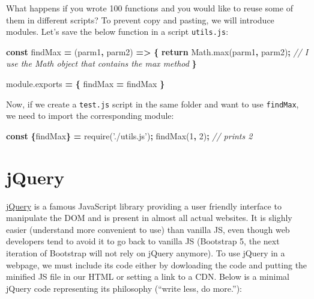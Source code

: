 \documentclass[]{book}
\newenvironment{Shaded}{\begin{snugshade}}{\end{snugshade}}
\newcommand{\AttributeTok}[1]{\textcolor[rgb]{0.77,0.63,0.00}{#1}}
\newcommand{\CommentTok}[1]{\textcolor[rgb]{0.56,0.35,0.01}{\textit{#1}}}
\newcommand{\ControlFlowTok}[1]{\textcolor[rgb]{0.13,0.29,0.53}{\textbf{#1}}}
\newcommand{\DecValTok}[1]{\textcolor[rgb]{0.00,0.00,0.81}{#1}}
\newcommand{\KeywordTok}[1]{\textcolor[rgb]{0.13,0.29,0.53}{\textbf{#1}}}
\newcommand{\NormalTok}[1]{#1}
\newcommand{\OperatorTok}[1]{\textcolor[rgb]{0.81,0.36,0.00}{\textbf{#1}}}
\newcommand{\StringTok}[1]{\textcolor[rgb]{0.31,0.60,0.02}{#1}}
\newcommand{\VariableTok}[1]{\textcolor[rgb]{0.00,0.00,0.00}{#1}}
\begin{document}
What happens if you wrote 100 functions and you would like to reuse some of them in different scripts? To prevent copy and pasting, we will introduce modules. Let's save the below function in a script \texttt{utils.js}:

\begin{Shaded}
\begin{Highlighting}[]
\KeywordTok{const}\NormalTok{ findMax }\OperatorTok{=}\NormalTok{ (parm1}\OperatorTok{,}\NormalTok{ parm2) }\OperatorTok{=>} \OperatorTok{\{}
  \ControlFlowTok{return} \VariableTok{Math}\NormalTok{.}\AttributeTok{max}\NormalTok{(parm1}\OperatorTok{,}\NormalTok{ parm2)}\OperatorTok{;} \CommentTok{// I use the Math object that contains the max method}
\OperatorTok{\}}

\VariableTok{module}\NormalTok{.}\AttributeTok{exports} \OperatorTok{=} \OperatorTok{\{}
\NormalTok{  findMax }\OperatorTok{=}\NormalTok{ findMax}
\OperatorTok{\}}
\end{Highlighting}
\end{Shaded}

Now, if we create a \texttt{test.js} script in the same folder and want to use \texttt{findMax}, we need to import the corresponding module:

\begin{Shaded}
\begin{Highlighting}[]
\KeywordTok{const} \OperatorTok{\{}\NormalTok{findMax}\OperatorTok{\}} \OperatorTok{=} \AttributeTok{require}\NormalTok{(}\StringTok{'./utils.js'}\NormalTok{)}\OperatorTok{;}
\AttributeTok{findMax}\NormalTok{(}\DecValTok{1}\OperatorTok{,} \DecValTok{2}\NormalTok{)}\OperatorTok{;} \CommentTok{// prints 2}
\end{Highlighting}
\end{Shaded}

\hypertarget{jquery}{%
\section{jQuery}\label{jquery}}

\href{https://jquery.com}{jQuery} is a famous JavaScript library providing a user friendly interface to manipulate the DOM and is present in almost all actual websites. It is slighly easier (understand more convenient to use) than vanilla JS, even though web developers tend to avoid it to go back to vanilla JS (Bootstrap 5, the next iteration of Bootstrap will not rely on jQuery anymore). To use jQuery in a webpage, we must include its code either by dowloading the code and putting the minified JS file in our HTML or setting a link to a CDN.
Below is a minimal jQuery code representing its philosophy (``write less, do more.''):
\end{document}
